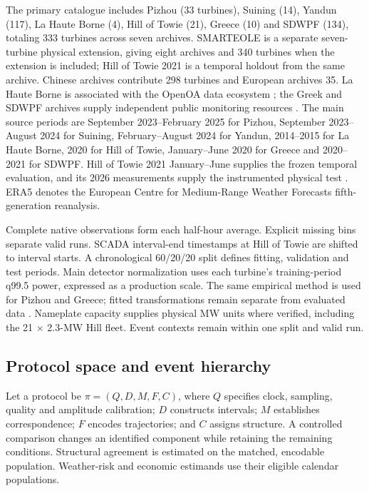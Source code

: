 \documentclass[preprint,12pt]{elsarticle}
\begin{document}
The primary catalogue includes Pizhou (33 turbines), Suining (14), Yandun (117), La Haute Borne (4), Hill of Towie (21), Greece (10) and SDWPF (134), totaling 333 turbines across seven archives. SMARTEOLE is a separate seven-turbine physical extension, giving eight archives and 340 turbines when the extension is included; Hill of Towie 2021 is a temporal holdout from the same archive. Chinese archives contribute 298 turbines and European archives 35. La Haute Borne is associated with the OpenOA data ecosystem \citep{perr-sauer2021openoa}; the Greek and SDWPF archives supply independent public monitoring resources \citep{greece2024, sdwpfdata}. The main source periods are September 2023--February 2025 for Pizhou, September 2023--August 2024 for Suining, February--August 2024 for Yandun, 2014--2015 for La Haute Borne, 2020 for Hill of Towie, January--June 2020 for Greece and 2020--2021 for SDWPF. Hill of Towie 2021 January--June supplies the frozen temporal evaluation, and its 2026 measurements supply the instrumented physical test \citep{hill2026data}. ERA5 denotes the European Centre for Medium-Range Weather Forecasts fifth-generation reanalysis.

Complete native observations form each half-hour average. Explicit missing bins separate valid runs. SCADA interval-end timestamps at Hill of Towie are shifted to interval starts. A chronological 60/20/20 split defines fitting, validation and test periods. Main detector normalization uses each turbine's training-period q99.5 power, expressed as a production scale. The same empirical method is used for Pizhou and Greece; fitted transformations remain separate from evaluated data \citep{leakage2023}. Nameplate capacity supplies physical MW units where verified, including the 21 × 2.3-MW Hill fleet. Event contexts remain within one split and valid run.

\subsection{Protocol space and event hierarchy}\label{protocol-space-and-event-hierarchy}

Let a protocol be \(\pi=(Q,D,M,F,C)\), where \(Q\) specifies clock, sampling, quality and amplitude calibration; \(D\) constructs intervals; \(M\) establishes correspondence; \(F\) encodes trajectories; and \(C\) assigns structure. A controlled comparison changes an identified component while retaining the remaining conditions. Structural agreement is estimated on the matched, encodable population. Weather-risk and economic estimands use their eligible calendar populations.
\end{document}
